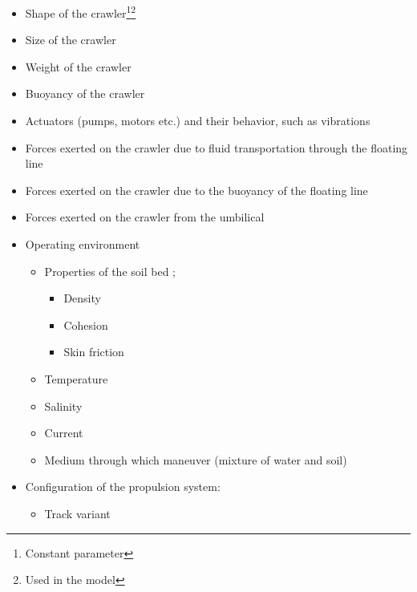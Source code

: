 \begin{itemize}
    \setlength\itemsep{0mm}
    \item Shape of the crawler\footnote{\label{c} Constant parameter}\footnote{\label{used} Used in the model}
    \item Size of the crawler\footnotemark[\getrefnumber{c}]
    \item Weight of the crawler\footnotemark[\getrefnumber{c}]
    \item Buoyancy of the crawler\footnotemark[\getrefnumber{c}]
    \item Actuators (pumps, motors etc.) and their behavior, such as vibrations
    \item Forces exerted on the crawler due to fluid transportation through the floating line
    \item Forces exerted on the crawler due to the buoyancy of the floating line
    \item Forces exerted on the crawler from the umbilical
    \item Operating environment
    \begin{itemize}
        \setlength\itemsep{0mm}
        \item Properties of the soil bed \cite{lotman_applicable_2009};
        \begin{itemize}
            \setlength\itemsep{0mm}
            \item Density
            \item Cohesion
            \item Skin friction
        \end{itemize}
        \item Temperature
        \item Salinity
        \item Current
        \item Medium through which maneuver (mixture of water and soil)
    \end{itemize}
    \item Configuration of the propulsion system:
    \begin{itemize}
        \setlength\itemsep{0mm}
        \item Track variant \cite{lotman_applicable_2009}
        \begin{itemize}

\end{itemize}
\end{itemize}
\end{itemize}
